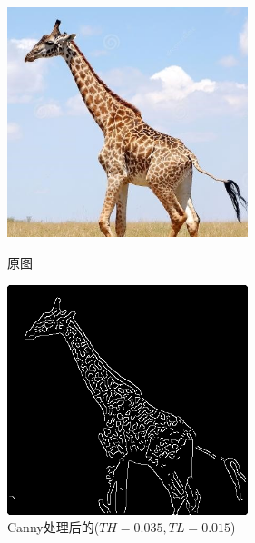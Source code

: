 \documentclass[11pt, a4paper, UTF8]{ctexart}
\begin{document}
\begin{figure}[H]
  \centering
  \begin{minipage}[t]{0.48\textwidth}
  \centering
  \includegraphics[width=7cm]{giraffe.jpg}
  \caption{原图}
  \end{minipage}
  \begin{minipage}[t]{0.48\textwidth}
  \centering
  \includegraphics[width=7cm]{Canny_TH=0.035_TL=0.015_giraffe.png}
  \caption{Canny处理后的($TH=0.035,TL=0.015$)}
  \end{minipage}
\end{figure}
\end{document}
